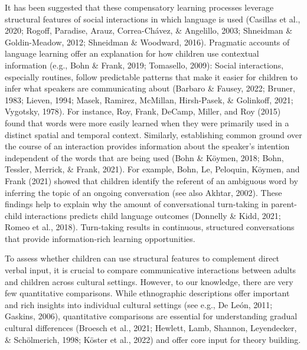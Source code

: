 \documentclass[
  man,floatsintext]{apa6}
\begin{document}
It has been suggested that these compensatory learning processes leverage structural features of social interactions in which language is used (Casillas et al., 2020; Rogoff, Paradise, Arauz, Correa-Chávez, \& Angelillo, 2003; Shneidman \& Goldin-Meadow, 2012; Shneidman \& Woodward, 2016). Pragmatic accounts of language learning offer an explanation for how children use contextual information (e.g., Bohn \& Frank, 2019; Tomasello, 2009): Social interactions, especially routines, follow predictable patterns that make it easier for children to infer what speakers are communicating about (Barbaro \& Fausey, 2022; Bruner, 1983; Lieven, 1994; Masek, Ramirez, McMillan, Hirsh-Pasek, \& Golinkoff, 2021; Vygotsky, 1978). For instance, Roy, Frank, DeCamp, Miller, and Roy (2015) found that words were more easily learned when they were primarily used in a distinct spatial and temporal context. Similarly, establishing common ground over the course of an interaction provides information about the speaker's intention independent of the words that are being used (Bohn \& Köymen, 2018; Bohn, Tessler, Merrick, \& Frank, 2021). For example, Bohn, Le, Peloquin, Köymen, and Frank (2021) showed that children identify the referent of an ambiguous word by inferring the topic of an ongoing conversation (see also Akhtar, 2002). These findings help to explain why the amount of conversational turn-taking in parent-child interactions predicts child language outcomes (Donnelly \& Kidd, 2021; Romeo et al., 2018). Turn-taking results in continuous, structured conversations that provide information-rich learning opportunities.

To assess whether children can use structural features to complement direct verbal input, it is crucial to compare communicative interactions between adults and children across cultural settings. However, to our knowledge, there are very few quantitative comparisons. While ethnographic descriptions offer important and rich insights into individual cultural settings (see e.g., De León, 2011; Gaskins, 2006), quantitative comparisons are essential for understanding gradual cultural differences (Broesch et al., 2021; Hewlett, Lamb, Shannon, Leyendecker, \& Schölmerich, 1998; Köster et al., 2022) and offer core input for theory building.
\end{document}

